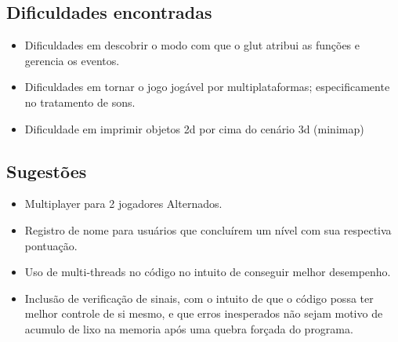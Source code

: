 \subsection{Dificuldades encontradas}\label{dificuldades}

\begin{itemize}
	\item Dificuldades em descobrir o modo com que o glut atribui as funções e gerencia os eventos.
	\item Dificuldades em tornar o jogo jogável por multiplataformas; especificamente no tratamento de sons.
	\item Dificuldade em imprimir objetos 2d por cima do cenário 3d (minimap)
\end{itemize}


\subsection{Sugestões}\label{sugest}

\begin{itemize}
	\item Multiplayer para 2 jogadores Alternados.
	\item Registro de nome para usuários que concluírem um nível com sua respectiva pontuação.
	\item Uso de multi-threads no código no intuito de conseguir melhor desempenho.
	\item Inclusão de verificação de sinais, com o intuito de que o código possa ter melhor controle de si mesmo, e que erros inesperados não sejam motivo de acumulo de lixo na memoria após uma quebra forçada do programa.
\end{itemize}



